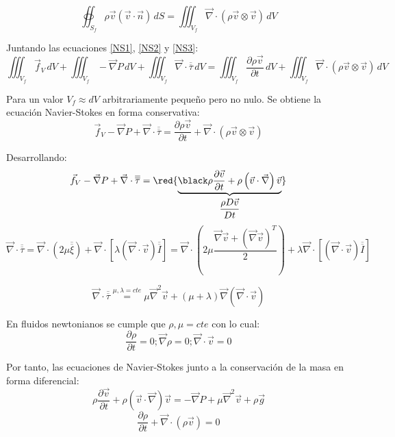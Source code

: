 \begin{equation}
	\label{NS3}
\oiint_{S_f}\rho\vec{v}\left(\vec{v}\cdot\vec{n}\right)\,dS
=
\iiint_{V_f}\vec{\nabla}\cdot\left(\rho \vec{ v} \otimes \vec{v}\right)\,dV
\end{equation}

Juntando las ecuaciones \eqref{NS1}, \eqref{NS2} y \eqref{NS3}:
\[\iiint_{V_f}\vec{f}_V\,dV
+
\iiint_{V_f}-\vec{\nabla}P\,dV
+
\iiint_{V_f}\vec{\nabla}\cdot\overline{\overline{\tau}}\,dV
=
\iiint_{V_f}\dfrac{\partial \rho\vec{v}}{\partial t}\,dV
+
\iiint_{V_f}\vec{\nabla}\cdot\left(\rho \vec{ v} \otimes \vec{v}\right)\,dV
\]

Para un valor $V_f \approx dV$ arbitrariamente pequeño pero no nulo. Se obtiene la ecuación Navier-Stokes en forma conservativa:
\[
\vec{f}_V
-
\vec{\nabla}P
+
\vec{\nabla}\cdot\overline{\overline{\tau}}
=
\dfrac{\partial \rho\vec{v}}{\partial t}
+
\vec{\nabla}\cdot\left(\rho \vec{ v} \otimes \vec{v}\right)
\]

Desarrollando:
\[\vec{f}_V
-
\vec{\nabla}P
+
\vec{\nabla}\cdot\overline{\overline{\tau}}
=
\red{\underbrace{\black \rho\dfrac{\partial\vec{v}}{\partial t}
+
\rho \left(\vec{v}\cdot\vec{\nabla}\right)\vec{v}}_{\dfrac{\rho D\vec{v}}{Dt}}}\]
\black
\[\vec{\nabla}\cdot\overline{\overline{\tau}}
=
\vec{\nabla}\cdot\left(2\mu\overline{\overline{\xi}}\right)
+
\vec{\nabla}\cdot\left[\lambda\left(\vec{\nabla}\cdot\vec{v}\right)\overline{\overline{I}}\right]
=
\vec{\nabla}\cdot\left(2\mu\dfrac{\vec{\nabla}\vec{v}+\left(\vec{\nabla}\vec{v}\right)^T}{2}\right)
+
\lambda\vec{\nabla}\cdot\left[\left(\vec{\nabla}\cdot\vec{v}\right)\overline{\overline{I}}\right]
\]

\[\vec{\nabla}\cdot\overline{\overline{\tau}}
	\stackrel{\mu,\lambda=cte}{=}
	\mu\vec{\nabla}^2\vec{v}+\left(\mu+\lambda\right)\vec{\nabla}\left(\vec{\nabla}\cdot\vec{v}\right)
	\]
	
En fluidos newtonianos se cumple que $\rho,\mu=cte$ con lo cual:
\[\dfrac{\partial \rho}{\partial t}=0; \vec{\nabla}\rho=0; \vec{\nabla}\cdot\vec{v}=0\]

Por tanto, las ecuaciones de Navier-Stokes junto a la conservación de la masa en forma diferencial:
\[\rho\dfrac{\partial \vec{v}}{\partial t}+\rho\left(\vec{v}\cdot\vec{\nabla}\right)\vec{v}=-\vec{\nabla}P+\mu\vec{\nabla}^2\vec{v}+\rho \vec{g}\]
\[\dfrac{\partial \rho}{\partial t} +\vec{\nabla}\cdot\left(\rho\vec{v}\right)=0\]
